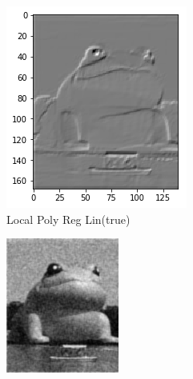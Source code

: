 \documentclass{beamer}
\begin{document}
\begin{frame}
\begin{figure}[htb]
\begin{subfigure}[b]{0.24\linewidth}
      \includegraphics[width=\linewidth]{images/poly_nr_lin.png}
      \caption{Local Poly Reg Lin(true)}
    \end{subfigure}
    \begin{subfigure}[b]{0.24\linewidth}
      \includegraphics[width=\linewidth]{images/poly_nr_true.png}

\end{subfigure}
\end{figure}
\end{frame}
\end{document}
